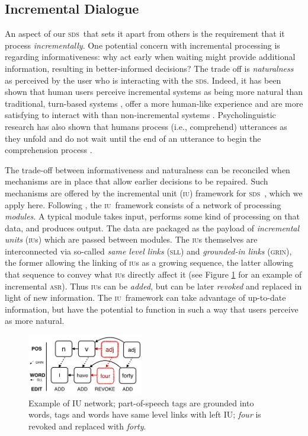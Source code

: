 \documentclass[11pt]{article}
\newcommand{\sds}[0]{\textsc{sds}}
\newcommand{\asr}[0]{\textsc{asr}}
\newcommand{\iu}[0]{\textsc{iu}}
\begin{document}
\subsection{Incremental Dialogue}

An aspect of our \sds\ that sets it apart from others is the requirement that it process \emph{incrementally}. One potential concern with incremental processing is regarding informativeness: why act early when waiting might provide additional information, resulting in better-informed decisions? The trade off is \emph{naturalness} as perceived by the user who is interacting with the \sds. Indeed, it has been shown that human users perceive incremental systems as being more natural than traditional, turn-based systems \cite{Aist2006,Skantze2009,skantze2010sigdial,Asri2014}, offer a more human-like experience  \cite{Edlund2008b} and are more satisfying to interact with than non-incremental systems \cite{Aistetal:incrunder-short}. Psycholinguistic research has also shown that humans process (i.e., comprehend) utterances as they unfold and do not wait until the end of an utterance to begin the comprehension process \cite{Tanenhaus1995,Spivey_2002tw}. 

The trade-off between informativeness and naturalness can be reconciled when mechanisms are in place that allow earlier decisions to be repaired. Such mechanisms are offered by the incremental unit (\iu) framework for \sds\ \cite{Schlangen2011}, which we apply here. Following , the \iu\ framework consists of a network of processing \emph{modules}. A typical module takes input, performs some kind of processing on that data, and produces output. The data are packaged as the payload of \emph{incremental units} (\textsc{iu}s) which are passed between modules. The \textsc{iu}s themselves are interconnected via so-called \emph{same level links} (\textsc{sll}) and \emph{grounded-in links} (\textsc{grin}), the former allowing the linking of \textsc{iu}s as a growing sequence, the latter allowing that sequence to convey what \textsc{iu}s directly affect it (see Figure \ref{fig:iu_example} for an example of incremental \asr). Thus \iu s can be \emph{added}, but can be later \emph{revoked} and replaced in light of new information. The \iu\ framework can take advantage of up-to-date information, but have the potential to function in such a way that users perceive as more natural.

\begin{figure} %
  \centering
      \includegraphics[width=0.45\textwidth]{figures/005_iu_example.png}	
      \caption{Example of IU network; part-of-speech tags are grounded into words, tags and words have same level links with left IU; \emph{four} is revoked and replaced with \emph{forty}.\label{fig:iu_example}}
            \vspace{-0.25cm}
\end{figure}
\end{document}
